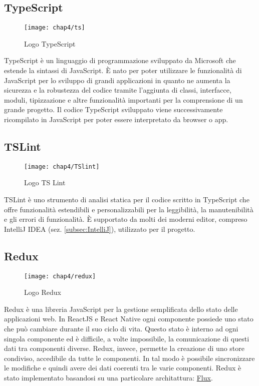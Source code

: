 \subsection{TypeScript}
\begin{figure}[H] 
	\centering
	\texttt{[image: chap4/ts]}
	\caption{Logo TypeScript}
\end{figure}
TypeScript è un linguaggio di programmazione sviluppato da Microsoft che 
estende la sintassi di JavaScript.  È nato per poter utilizzare le funzionalità di 
JavaScript per lo sviluppo di grandi applicazioni in quanto ne aumenta la 
sicurezza e la robustezza del codice tramite l'aggiunta di classi, interfacce, 
moduli, tipizzazione e altre funzionalità importanti per la comprensione di un 
grande progetto. 
Il codice TypeScript sviluppato viene successivamente ricompilato in JavaScript 
per poter essere interpretato da browser o app.

\subsection{TSLint}
\begin{figure}[H] 
	\centering
	\texttt{[image: chap4/TSlint]}
	\caption{Logo TS Lint}
\end{figure}
TSLint è uno strumento di analisi statica per il codice scritto in TypeScript 
che offre funzionalità estendibili e personalizzabili per la leggibilità, la 
manutenibilità e gli errori di funzionalità. 
È supportato da molti dei moderni editor, compreso IntelliJ IDEA (sez. 
\ref{subsec:IntelliJ}), utilizzato per il progetto.

\subsection{Redux}
\begin{figure}[H] 
	\centering
	\texttt{[image: chap4/redux]}
	\caption{Logo Redux}
\end{figure}
Redux è una libreria JavaScript per la gestione semplificata dello stato delle 
applicazioni web. In ReactJS e React Native ogni componente possiede uno stato 
che può cambiare durante il suo ciclo di vita. Questo stato è interno ad ogni 
singola componente ed è difficile, a volte impossibile, la comunicazione di questi 
dati tra componenti diverse. 
Redux, invece, permette la creazione di uno store condiviso, accedibile da tutte 
le componenti. In  tal modo è possibile sincronizzare le modifiche e quindi 
avere dei dati coerenti tra le varie componenti. 
Redux è stato implementato basandosi su una particolare architattura: 
\hyperref[subsec:flux]{Flux}.

